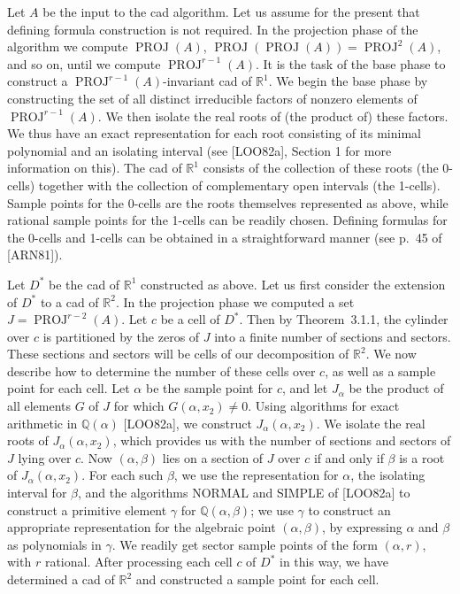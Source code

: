 \documentclass[11pt]{article}
\theoremstyle{plain}
\theoremstyle{definition}
\newcommand{\R}{\mathbb{R}}
\newcommand{\Q}{\mathbb{Q}}
\DeclareMathOperator{\PROJ}{PROJ}
\begin{document}
Let $A$ be the input to the cad algorithm. Let us assume for the
present that defining formula construction is not required. In the
projection phase of the algorithm we compute $\PROJ(A)$,
$\PROJ(\PROJ(A)) = \PROJ^2(A)$, and so on, until we compute
$\PROJ^{r-1}(A)$. It is the task of the base phase to construct a
$\PROJ^{r-1}(A)$-invariant cad of $\R^1$. We begin the base phase by
constructing the set of all distinct irreducible factors of nonzero
elements of $\PROJ^{r-1}(A)$. We then isolate the real roots of (the
product of) these factors. We thus have an exact representation for
each root consisting of its minimal polynomial and an isolating interval
(see [LOO82a], Section 1 for more information on this). The cad of
$\R^1$ consists of the collection of these roots (the 0-cells)
together with the collection of complementary open intervals (the
1-cells). Sample points for the 0-cells are the roots themselves
represented as above, while rational sample points for the 1-cells can
be readily chosen. Defining formulas for the 0-cells and 1-cells can be
obtained in a straightforward manner (see p.~45 of [ARN81]).

Let $D^*$ be the cad of $\R^1$ constructed as above. Let us first
consider the extension of $D^*$ to a cad of $\R^2$. In the projection
phase we computed a set $J = \PROJ^{r-2}(A)$. Let $c$ be a cell of
$D^*$. Then by Theorem~3.1.1, the cylinder over $c$ is partitioned by
the zeros of $J$ into a finite number of sections and sectors. These
sections and sectors will be cells of our decomposition of $\R^2$. We
now describe how to determine the number of these cells over $c$, as
well as a sample point for each cell. Let $\alpha$ be the sample point
for $c$, and let $J_\alpha$ be the product of all elements $G$ of $J$
for which $G(\alpha, x_2) \ne 0$. Using algorithms for exact arithmetic
in $\Q(\alpha)$ [LOO82a], we construct $J_\alpha(\alpha, x_2)$. We
isolate the real roots of $J_\alpha(\alpha, x_2)$, which provides us
with the number of sections and sectors of $J$ lying over $c$. Now
$(\alpha, \beta)$ lies on a section of $J$ over $c$ if and only if
$\beta$ is a root of $J_\alpha(\alpha, x_2)$. For each such $\beta$, we
use the representation for $\alpha$, the isolating interval for
$\beta$, and the algorithms \textsc{NORMAL} and \textsc{SIMPLE} of
[LOO82a] to construct a primitive element $\gamma$ for
$\Q(\alpha, \beta)$; we use $\gamma$ to construct an appropriate
representation for the algebraic point $(\alpha, \beta)$, by expressing
$\alpha$ and $\beta$ as polynomials in $\gamma$. We readily get sector
sample points of the form $(\alpha, r)$, with $r$ rational. After
processing each cell $c$ of $D^*$ in this way, we have determined a
cad of $\R^2$ and constructed a sample point for each cell.
\end{document}
